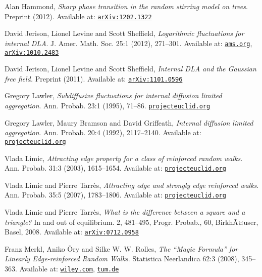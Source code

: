 \documentclass{emsprocart}
\theoremstyle{plain}
\begin{document}
\begin{thebibliography}{10}
Alan Hammond, \emph{Sharp phase transition in the random
stirring model on trees}. Preprint (2012). Available at: \href{http://arxiv.org/abs/1202.1322}{\nolinkurl{arXiv:1202.1322}}

David Jerison, Lionel Levine and Scott Sheffield,
\emph{Logarithmic fluctuations for internal DLA}. J. Amer. Math. Soc.
25:1 (2012), 271--301. Available at: \href{http://dx.doi.org/10.1090/S0894-0347-2011-00716-9}{\nolinkurl{ams.org}},
\href{http://arxiv.org/abs/1010.2483}{\nolinkurl{arXiv:1010.2483}}

David Jerison, Lionel Levine and Scott Sheffield,
\emph{Internal DLA and the Gaussian free field. }Preprint (2011).
Available at: \href{http://arxiv.org/abs/1101.0596}{\nolinkurl{arXiv:1101.0596}}

Gregory Lawler, \emph{Subdiffusive fluctuations for
internal diffusion limited aggregation}. Ann. Probab. 23:1 (1995),
71--86. \href{http://projecteuclid.org/euclid.aop/1176988377}{\nolinkurl{projecteuclid.org}}

Gregory Lawler, Maury Bramson and David Griffeath,
\emph{Internal diffusion limited aggregation}. Ann. Probab. 20:4 (1992),
2117--2140. Available at: \href{http://projecteuclid.org/euclid.aop/1176989542}{\nolinkurl{projecteuclid.org}}

Vlada Limic, \emph{Attracting edge property for a class
of reinforced random walks}. Ann. Probab. 31:3 (2003), 1615--1654.
Available at: \href{http://projecteuclid.org/euclid.aop/1055425792}{\nolinkurl{projecteuclid.org}}

Vlada Limic and Pierre Tarr\`es, \emph{Attracting
edge and strongly edge reinforced walks}. Ann. Probab. 35:5 (2007),
1783--1806. Available at: \href{http://projecteuclid.org/euclid.aop/1189000928}{\nolinkurl{projecteuclid.org}}

Vlada Limic and Pierre Tarr\`es, \emph{What is the difference
between a square and a triangle?} In and out of equilibrium. 2, 481--495,
Progr. Probab., 60, BirkhÃ¤user, Basel, 2008. Available at: \href{http://arxiv.org/abs/0712.0958}{\nolinkurl{arXiv:0712.0958}}

Franz Merkl, Aniko \"{O}ry and Silke W. W. Rolles,
\emph{The ``Magic Formula'' for Linearly
Edge-reinforced Random Walks}. Statistica Neerlandica 62:3 (2008),
345--363. Available at: \href{http://onlinelibrary.wiley.com/doi/10.1111/j.1467-9574.2008.00402.x/abstract}{\nolinkurl{wiley.com}},
\href{http://www-m5.ma.tum.de/foswiki/pub/M5/Allgemeines/SilkeRollesPublications/magic-snversion.pdf}{\nolinkurl{tum.de}}


\end{thebibliography}
\end{document}
